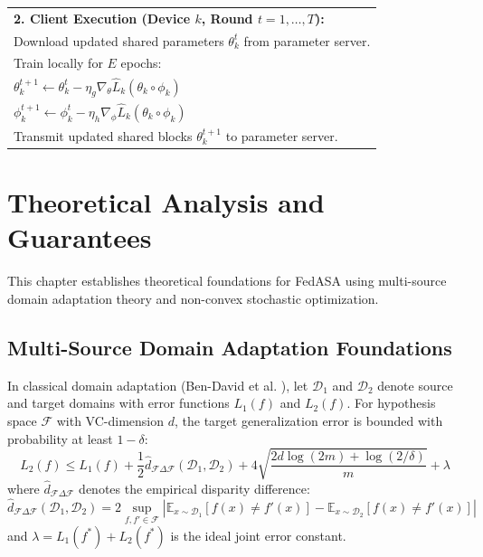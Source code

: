 \documentclass[12pt,a4paper]{report}
\begin{document}
\begin{table}[htbp]
\begin{tabular}{|p{14.0cm}|}
\textbf{2. Client Execution (Device $k$, Round $t = 1, \dots, T$):} \\
\quad Download updated shared parameters $\theta_k^t$ from parameter server. \\
\quad Train locally for $E$ epochs: \\
\quad \quad $\theta_k^{t+1} \leftarrow \theta_k^t - \eta_g \nabla_{\theta} \hat{L}_k(\theta_k \circ \phi_k)$ \\
\quad \quad $\phi_k^{t+1} \leftarrow \phi_k^t - \eta_h \nabla_{\phi} \hat{L}_k(\theta_k \circ \phi_k)$ \\
\quad Transmit updated shared blocks $\theta_k^{t+1}$ to parameter server. \\
\hline
\end{tabular}
\end{table}


\chapter{Theoretical Analysis and Guarantees}

This chapter establishes theoretical foundations for FedASA using multi-source domain adaptation theory and non-convex stochastic optimization.

\section{Multi-Source Domain Adaptation Foundations}
In classical domain adaptation (Ben-David et al. \cite{ref_bendavid_da}), let $\mathcal{D}_1$ and $\mathcal{D}_2$ denote source and target domains with error functions $L_1(f)$ and $L_2(f)$. For hypothesis space $\mathcal{F}$ with VC-dimension $d$, the target generalization error is bounded with probability at least $1-\delta$:
\begin{equation}
    L_2(f) \le L_1(f) + \frac{1}{2} \hat{d}_{\mathcal{F}\Delta\mathcal{F}}(\mathcal{D}_1, \mathcal{D}_2) + 4\sqrt{\frac{2d\log(2m) + \log(2/\delta)}{m}} + \lambda
\end{equation}
where $\hat{d}_{\mathcal{F}\Delta\mathcal{F}}$ denotes the empirical disparity difference:
\begin{equation}
    \hat{d}_{\mathcal{F}\Delta\mathcal{F}}(\mathcal{D}_1, \mathcal{D}_2) = 2 \sup_{f, f' \in \mathcal{F}} \left| \mathbb{E}_{x \sim \mathcal{D}_1} [f(x) \neq f'(x)] - \mathbb{E}_{x \sim \mathcal{D}_2} [f(x) \neq f'(x)] \right|
\end{equation}
and $\lambda = L_1(f^*) + L_2(f^*)$ is the ideal joint error constant.
\end{document}
